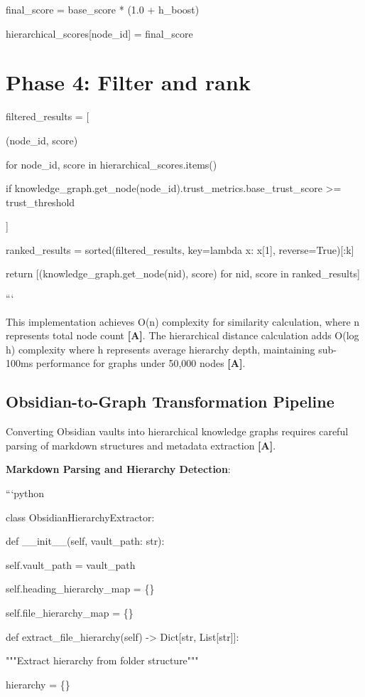 \documentclass[a4paper,11pt]{article}
\newcommand{\alabel}{\textbf{\textcolor{acolor}{[A]}}}
\begin{document}
final\_score = base\_score * (1.0 + h\_boost)

hierarchical\_scores[node\_id] = final\_score


\section{Phase 4: Filter and rank}
filtered\_results = [

(node\_id, score)

for node\_id, score in hierarchical\_scores.items()

if knowledge\_graph.get\_node(node\_id).trust\_metrics.base\_trust\_score >= trust\_threshold

]


ranked\_results = sorted(filtered\_results, key=lambda x: x[1], reverse=True)[:k]


return [(knowledge\_graph.get\_node(nid), score) for nid, score in ranked\_results]

```


This implementation achieves O(n) complexity for similarity calculation, where n represents total node count \alabel{}. The hierarchical distance calculation adds O(log h) complexity where h represents average hierarchy depth, maintaining sub-100ms performance for graphs under 50,000 nodes \alabel{}.


\subsection{Obsidian-to-Graph Transformation Pipeline}

Converting Obsidian vaults into hierarchical knowledge graphs requires careful parsing of markdown structures and metadata extraction \alabel{}.


\textbf{Markdown Parsing and Hierarchy Detection}:

```python

class ObsidianHierarchyExtractor:

def \_\_init\_\_(self, vault\_path: str):

self.vault\_path = vault\_path

self.heading\_hierarchy\_map = \{\}

self.file\_hierarchy\_map = \{\}


def extract\_file\_hierarchy(self) -> Dict[str, List[str]]:

"""Extract hierarchy from folder structure"""

hierarchy = \{\}
\end{document}
